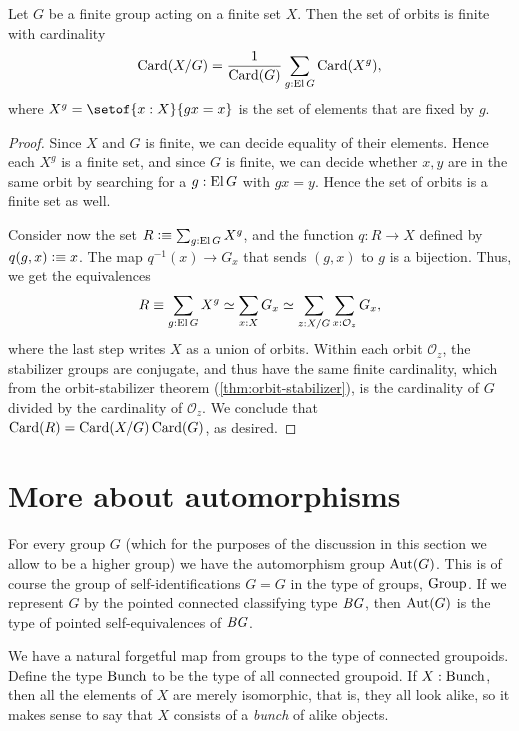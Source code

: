 \begin{lemma}
  \label{lem:burnside}
  Let $G$ be a finite group acting on a finite set $X$.
  Then the set of orbits is finite with cardinality
  \[
    \Card(X/G) = \frac1{\Card(G)}\sum_{g:\El G}\Card(X^g),
  \]
  where $X^g = \setof{x:X}{gx=x}$ is the set of elements
  that are fixed by $g$.
\end{lemma}
\begin{proof}
  Since $X$ and $G$ is finite, we can decide equality of their elements.
  Hence each $X^g$ is a finite set, and since $G$ is finite,
  we can decide whether $x,y$ are in the same orbit by searching
  for a $g : \El G$ with $gx = y$.
  Hence the set of orbits is a finite set as well.
  
  Consider now the set $R \defeq \sum_{g:\El G} X^g$,
  and the function $q : R \to X$
  defined by $q(g,x) \defeq x$.
  The map $q^{-1}(x) \to G_x$ that sends $(g,x)$ to $g$ is a bijection.
  Thus, we get the equivalences
  \[
    R \jdeq \sum_{g:\El G} X^g \equiv \sum_{x:X} G_x
    \equiv \sum_{z:X/G} \sum_{x : \mathcal O_z} G_x,
  \]
  where the last step writes $X$ as a union of orbits.
  Within each orbit $\mathcal O_z$,
  the stabilizer groups are conjugate,
  and thus have the same finite cardinality,
  which from the orbit-stabilizer theorem (\cref{thm:orbit-stabilizer}),
  is the cardinality of $G$ divided by the cardinality of $\mathcal O_z$.
  We conclude that $\Card(R) = \Card(X/G)\Card(G)$, as desired.
\end{proof}

\section{More about automorphisms}
\label{sec:automorphisms}

For every group $G$ (which for the purposes of the discussion
in this section we allow to be a higher group)
we have the automorphism group $\Aut(G)$.
This is of course the group of self-identifications $G = G$ in the type of groups, $\mathrm{Group}$.
If we represent $G$ by the pointed connected classifying type $\mathit{B}\mathit{G}$,
then $\Aut(G)$ is the type of pointed self-equivalences of $\mathit{B}\mathit{G}$.

We have a natural forgetful map from groups to the type of connected groupoids.
Define the type $\mathrm{Bunch}$ to be the type of all connected groupoid.
If $X:\mathrm{Bunch}$, then all the elements of $X$ are merely isomorphic,
that is, they all look alike,
so it makes sense to say that $X$ consists of a \emph{bunch} of alike objects.

